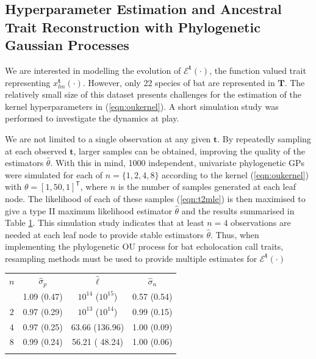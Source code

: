 \documentclass{ws-rv9x6}
\begin{document}
\subsection{Hyperparameter Estimation and Ancestral Trait Reconstruction with Phylogenetic Gaussian Processes}

We are interested in modelling the evolution of \(\mathcal{E}^{\mathbf{t}}(\cdot)\), the function valued trait representing \(x_{lm}^{\mathbf{t}}(\cdot)\). However, only 22 species of bat are represented in \(\mathbf{T}\). The relatively small size of this dataset presents challenges for the estimation of the kernel hyperparameters in (\ref{eqn:oukernel}). A short simulation study was performed to investigate the dynamics at play.

We are not limited to a single observation at any given \(\mathbf{t}\). By repeatedly sampling at each observed \(\mathbf{t}\), larger samples can be obtained, improving the quality of the estimators \(\hat{\theta}\). With this in mind, 1000 independent, univariate phylogenetic GPs were simulated for each of \(n = \{1,2,4,8\}\) according to the kernel (\ref{eqn:oukernel}) with \(\theta = [1,50,1]^{\mathsf{T}}\), where \(n\) is the number of samples generated at each leaf node. The likelihood of each of these samples (\ref{eqn:t2mle}) is then maximised to give a type II maximum likelihood estimator \(\hat{\theta}\) and the results summarised in Table \ref{tab::ind_simulation}. This simulation study indicates that at least \(n = 4\) observations are needed at each leaf node to provide stable estimators \(\hat{\theta}\). Thus, when implementing the phylogenetic OU process for bat echolocation call traits, resampling methods must be used to provide multiple estimates for \(\mathcal{E}^{\mathbf{t}}(\cdot)\)

\begin{table}[ht]
	{
		\begin{tabular}{@{}cccc@{}} \toprule
			\(n\)  & \(\hat{\sigma}_p \) & \(\hat{\ell}\) & \(\hat{\sigma}_n\) \\
			\colrule
			1 & 1.09 (0.47) & \(10^{14}\) (\(10^{15}\)) & 0.57 (0.54) \\
			2 & 0.97 (0.29) & \(10^{13}\) (\(10^{14}\)) & 0.99 (0.15) \\
			4 & 0.97 (0.25) & 63.66 (136.96) & 1.00 (0.09) \\
			8 & 0.99 (0.24) & 56.21 ( 48.24) & 1.00 (0.06) \\			
			\botrule
		\end{tabular}
	}
	\label{tab::ind_simulation}
\end{table}
\end{document}
